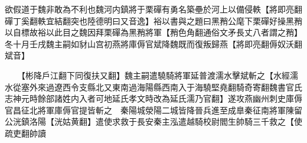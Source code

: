 欲假道于魏非敢為不利也魏河内鎮將于栗磾有勇名築壘於河上以備侵軼【將即亮翻磾丁奚翻軼宜結翻突也陸德明曰又音逸】裕以書與之題曰黑矟公麾下栗磾好操黑矟以自標故裕以此目之魏因拜栗磾為黑矟將軍【矟色角翻通俗文矛長丈八者謂之矟】　冬十月壬戌魏主嗣如豺山宫初燕將庫傉官斌降魏既而復叛歸燕【將即亮翻傉奴沃翻斌音】

　　【彬降戶江翻下同復扶又翻】魏主嗣遣驍騎將軍延普渡濡水擊斌斬之【水經濡水從塞外來過遼西令支縣北又東南過海陽縣西南入于海驍堅堯翻騎奇寄翻魏書官氏志神元時餘部諸姓内入者可地延氏孝文時改為延氏濡乃官翻】遂攻燕幽州刺史庫傉官昌征北將軍庫傉官提皆斬之　秦陽城滎陽二城皆降晉兵進至成臯秦征南將軍陳留公洸鎮洛陽【洸姑黄翻】遣使求救于長安秦主泓遣越騎校尉閻生帥騎三千救之【使疏吏翻帥讀